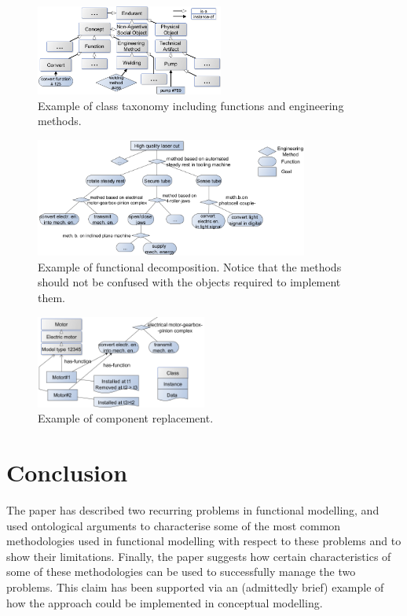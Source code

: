\documentclass[
]{ceurart}
\begin{document}
\begin{figure}
  \centering
  \includegraphics[width=0.55\textwidth]{class-taxonomy-small.png}
  \caption{\label{fig:class-taxonomy} Example of class taxonomy including functions and engineering methods.
  }
\end{figure}
\begin{figure}
  \centering
  \includegraphics[width=0.80\textwidth]{functional-decomposition-small-2.png}
  \caption{\label{fig:functional-decomposition} Example of functional decomposition. Notice that the methods should not be confused with the objects required to implement them.}
\end{figure}
\begin{figure}
  \centering
  \includegraphics[width=0.50\textwidth]{functional-decomposition-with-replacement-small.png}
  \caption{\label{fig:replacement} Example of component replacement.}
\end{figure}

\section{Conclusion}
The paper has described two recurring problems in functional modelling, and used ontological arguments to characterise some of the most common methodologies used in functional modelling with respect to these problems and to show their limitations. 
Finally, the paper suggests how certain characteristics of some of these methodologies can be used to successfully manage the two problems. %
This claim has been supported via an (admittedly brief) example of how the approach could be implemented in conceptual modelling.
\end{document}
